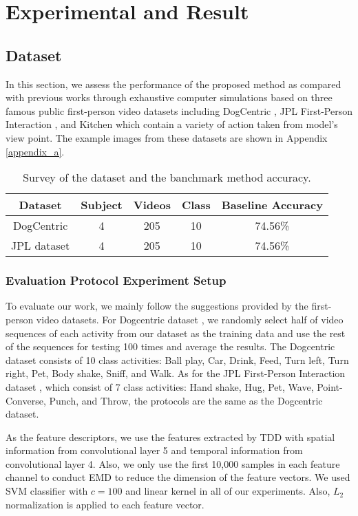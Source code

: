 \newpage
\chapter{Experimental and Result}
\label{sec:Experiment}
\section{Dataset}

In this section, we assess the performance of the proposed method as
compared with previous works through exhaustive computer simulations
based on three famous public first-person video datasets including
DogCentric \cite{yumi2014first}, JPL First-Person Interaction
\cite{ryoo2013first}, and Kitchen \cite{spriggs2009temporal} which contain a variety of action
taken from model's view point. The example images from these datasets are shown in Appendix \ref{appendix_a}.


\begin{table}[!b]
    \centering
    \begin{tabular}{c|c|c|c|c}
        \hline
        \hline
        Dataset &  Subject & Videos & Class & Baseline Accuracy\\
        \hline
        DogCentric & 4 & 205 & 10 & 74.56\% \\
        JPL dataset & 4 & 205 & 10 & 74.56\% \\
        \hline
    \end{tabular}
    \caption{Survey of the dataset and the banchmark method accuracy.}
    \label{tab:my_label}
\end{table}


\subsection{Evaluation Protocol Experiment Setup}


To evaluate our work, we mainly follow the suggestions provided by
the first-person video datasets. For Dogcentric dataset
\cite{yumi2014first}, %
we randomly select half of video sequences of each activity from our
dataset as the training data and use the rest of the sequences for
testing 100 times and average the results.  The Dogcentric dataset
consists of 10 class activities: Ball play, Car, Drink, Feed, Turn
left, Turn right, Pet, Body shake, Sniff, and Walk. As for the JPL
First-Person Interaction dataset \cite{ryoo2013first}, which consist
of 7 class activities: Hand shake, Hug, Pet, Wave, Point-Converse,
Punch, and Throw, the protocols are the same as the Dogcentric
dataset.

As the feature descriptors, we use the features extracted by TDD
with spatial information from convolutional layer 5 and temporal
information from convolutional layer 4. %
Also, we only use the first 10,000 samples in each feature channel
to conduct EMD  to reduce the dimension of the feature vectors. We
used SVM classifier with $c=100$ and linear kernel in all of our
experiments. Also, $L_{2}$ normalization is applied to each feature
vector.